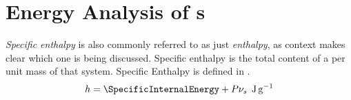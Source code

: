 \section{Energy Analysis of s}\label{def:Energy_Analysis_Closed_Systems}

\begin{definition}\label{def:Specific_Enthalpy}
  \emph{Specific enthalpy} is also commonly referred to as just \emph{enthalpy}, as context makes clear which one is being discussed.
  Specific enthalpy is the total  content of a  per unit mass of that system.
  Specific Enthalpy is defined in .
  \begin{equation}\label{eq:Specific_Enthalpy}
    \SpecificEnthalpy = \SpecificInternalEnergy + \Pressure \SpecificVolume \:\: \si{\joule\per\gram}
  \end{equation}
\end{definition}

